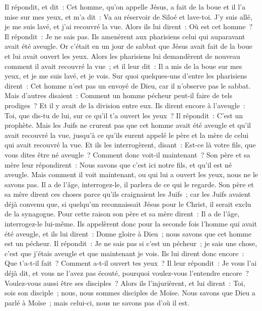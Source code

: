 \begin{multicols}{2}
Il répondit, et dit~: Cet homme, qu'on appelle Jésus, a fait de la boue et il l'a mise sur mes yeux, et m'a dit~: Va au réservoir de Siloé et lave-toi. J'y suis allé, je me suis lavé, et j'ai recouvré la vue.
Alors ils lui dirent~: Où est cet homme~? Il répondit~: Je ne sais pas.
Ils amenèrent aux pharisiens celui qui auparavant avait été aveugle.
Or c'était en un jour de sabbat que Jésus avait fait de la boue et lui avait ouvert les yeux.
Alors les pharisiens lui demandèrent de nouveau comment il avait recouvré la vue~; et il leur dit~: Il a mis de la boue sur mes yeux, et je me suis lavé, et je vois.
Sur quoi quelques-uns d'entre les pharisiens dirent~: Cet homme n'est pas un envoyé de Dieu, car il n'observe pas le sabbat. Mais d'autres disaient~: Comment un homme pécheur peut-il faire de tels prodiges~? Et il y avait de la division entre eux.
Ils dirent encore à l'aveugle~: Toi, que dis-tu de lui, sur ce qu'il t'a ouvert les yeux~? Il répondit~: C'est un prophète.
Mais les Juifs ne crurent pas que cet homme avait été aveugle et qu'il avait recouvré la vue, jusqu'à ce qu'ils eurent appelé le père et la mère de celui qui avait recouvré la vue.
Et ils les interrogèrent, disant~: Est-ce là votre fils, que vous dites être né aveugle~? Comment donc voit-il maintenant~?
Son père et sa mère leur répondirent~: Nous savons que c'est ici notre fils, et qu'il est né aveugle.
Mais comment il voit maintenant, ou qui lui a ouvert les yeux, nous ne le savons pas. Il a de l'âge, interrogez-le, il parlera de ce qui le regarde.
Son père et sa mère dirent ces choses parce qu'ils craignaient les Juifs~; car les Juifs avaient déjà convenu que, si quelqu'un reconnaissait Jésus pour le Christ, il serait exclu de la synagogue.
Pour cette raison son père et sa mère dirent~: Il a de l'âge, interrogez-le lui-même.
Ils appelèrent donc pour la seconde fois l'homme qui avait été aveugle, et ils lui dirent~: Donne gloire à Dieu~; nous savons que cet homme est un pécheur.
Il répondit~: Je ne sais pas si c'est un pécheur~; je sais une chose, c'est que j'étais aveugle et que maintenant je vois.
Ils lui dirent donc encore~: Que t'a-t-il fait~? Comment a-t-il ouvert tes yeux~?
Il leur répondit~: Je vous l'ai déjà dit, et vous ne l'avez pas écouté, pourquoi voulez-vous l'entendre encore~? Voulez-vous aussi être ses disciples~?
Alors ils l'injurièrent, et lui dirent~: Toi, sois son disciple~; nous, nous sommes disciples de Moïse.
Nous savons que Dieu a parlé à Moïse~; mais celui-ci, nous ne savons pas d'où il est.

\end{multicols}
